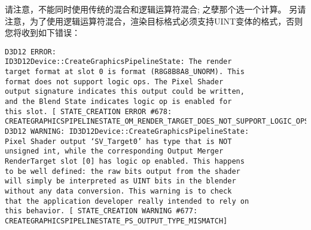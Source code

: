 \begin{flushleft}
请注意，不能同时使用传统的混合和逻辑运算符混合; 之孽那个选一个计算。 另请注意，为了使用逻辑运算符混合，渲染目标格式必须支持UINT变体的格式，否则您将收到如下错误：\\
\end{flushleft}
\begin{lstlisting}
D3D12 ERROR:
ID3D12Device::CreateGraphicsPipelineState: The render
target format at slot 0 is format (R8G8B8A8_UNORM). This
format does not support logic ops. The Pixel Shader
output signature indicates this output could be written,
and the Blend State indicates logic op is enabled for
this slot. [ STATE_CREATION ERROR #678:
CREATEGRAPHICSPIPELINESTATE_OM_RENDER_TARGET_DOES_NOT_SUPPORT_LOGIC_OPS]
D3D12 WARNING: ID3D12Device::CreateGraphicsPipelineState:
Pixel Shader output ‘SV_Target0’ has type that is NOT
unsigned int, while the corresponding Output Merger
RenderTarget slot [0] has logic op enabled. This happens
to be well defined: the raw bits output from the shader
will simply be interpreted as UINT bits in the blender
without any data conversion. This warning is to check
that the application developer really intended to rely on
this behavior. [ STATE_CREATION WARNING #677:
CREATEGRAPHICSPIPELINESTATE_PS_OUTPUT_TYPE_MISMATCH]
\end{lstlisting}

